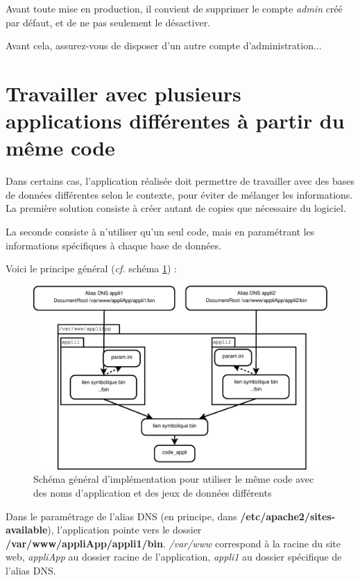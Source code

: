 Avant toute mise en production, il convient de supprimer le compte \textit{admin} créé par défaut, et de ne pas seulement le désactiver. 

Avant cela, assurez-vous de disposer d'un autre compte d'administration...

\section{Travailler avec plusieurs applications différentes à partir du même code}\label{dnsmultiple}

Dans certains cas, l'application réalisée doit permettre de travailler avec des bases de données différentes selon le contexte, pour éviter de mélanger les informations. La première solution consiste à créer autant de copies que nécessaire du logiciel.

La seconde consiste à n'utiliser qu'un seul code, mais en paramétrant les informations spécifiques à chaque base de données.

Voici le principe général (\textit{cf.} schéma \ref{dnsmultipleschema})  :
\begin{figure}[th]
\label{dnsmultipleschema}
\includegraphics[width=\linewidth]{dessin/dnsmultiple}
\caption{Schéma général d'implémentation pour utiliser le même code avec des noms d'application et des jeux de données différents}
\end{figure}

Dans le paramétrage de l'alias DNS (en principe, dans \textbf{/etc/apache2/sites-available}), l'application pointe vers le dossier \textbf{/var/www/appliApp/appli1/bin}. 
\textit{/var/www} correspond à la racine du site web, \textit{appliApp} au dossier racine de l'application, \textit{appli1} au dossier spécifique de l'alias DNS.

